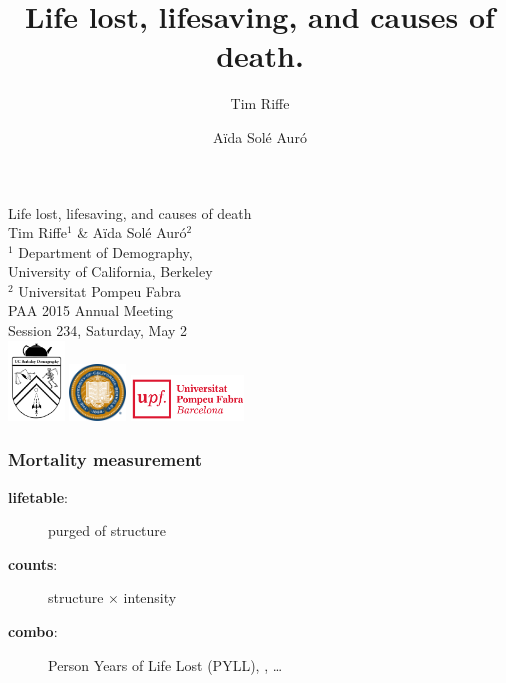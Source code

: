 \documentclass{beamer}
\title[Years Lost]{Life lost, lifesaving, and causes of death.}
\author[Riffe \& Sol\'{e}]
{
Tim Riffe \inst{1} \and A{\"i}da Sol\'{e} Aur\'{o} \inst{2}}
\institute %
{
  \inst{1}%
  Department of Demography, \\
  University of California, Berkeley \\
  \and
  \inst{2} Universitat Pompeu Fabra
}
\begin{document}
\begin{frame}[plain]

\vspace{3em}
\LARGE Life lost, lifesaving, and causes of death\\
\vspace{3 mm}
\normalsize Tim Riffe$^1$ \& A{\"i}da Sol\'{e} Aur\'{o}$^2$\\
\vspace{3 mm}
 $^1$ Department of Demography, \\
  \hspace{2mm} University of California, Berkeley \\
  $^2$ Universitat Pompeu Fabra\\
  \vspace{5 mm}
  PAA 2015 Annual Meeting \\
  Session 234, Saturday, May 2\\
  \vspace{10 mm}
  \includegraphics[width=1.5cm]{Figures/demogcrest}\hspace{.5cm}
  \includegraphics[width=1.5cm]{Figures/ucbseal1}\hspace{3cm}
  \includegraphics[height=1.2cm]{Figures/UPFcmyk}
\end{frame}


\begin{frame}
\frametitle{Mortality measurement}
\begin{description}
\item[\textbf{lifetable}:] purged of structure
\item[\textbf{counts}:] structure $\times$ intensity
\item[\textbf{combo}:] Person Years of Life Lost (PYLL),
\underline{\hspace{1cm}},
\ldots
\end{description}

\end{frame}
\end{document}

